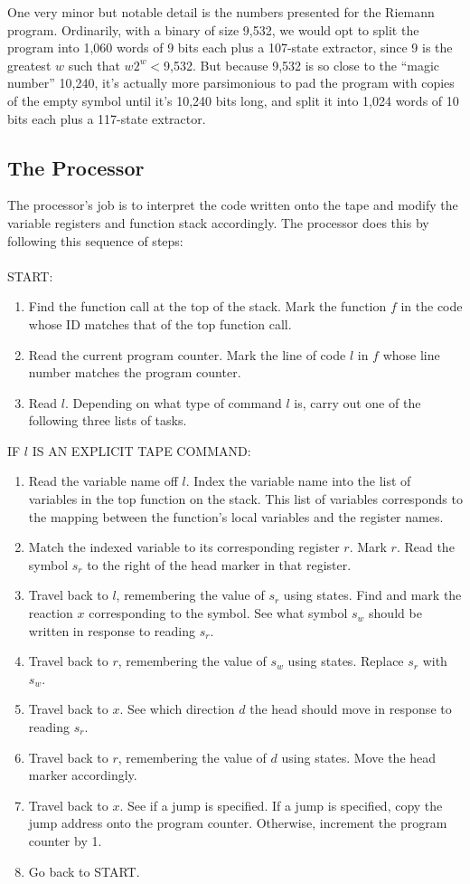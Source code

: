 \documentclass[11pt]{article}
\begin{document}
One very minor but notable detail is the numbers presented for the Riemann program. Ordinarily, with a binary of size 9,532, we would opt to split the program into 1,060 words of 9 bits each plus a 107-state extractor, since 9 is the greatest $w$ such that $w2^w < $9,532. But because 9,532 is so close to the ``magic number'' 10,240, it's actually more parsimonious to pad the program with copies of the empty symbol until it's 10,240 bits long, and split it into 1,024 words of 10 bits each plus a 117-state extractor.

\subsection{The Processor}

The processor's job is to interpret the code written onto the tape and modify the variable registers and function stack accordingly. The processor does this by following this sequence of steps:  \\ \\
START:
\begin{enumerate}
\item Find the function call at the top of the stack. Mark the function $f$ in the code whose ID matches that of the top function call.
\item Read the current program counter. Mark the line of code $l$ in $f$ whose line number matches the program counter.
\item Read $l$. Depending on what type of command $l$ is, carry out one of the following three lists of tasks.
\end{enumerate}

IF $l$ IS AN EXPLICIT TAPE COMMAND:
\begin{enumerate}
\item Read the variable name off $l$. Index the variable name into the list of variables in the top function on the stack. This list of variables corresponds to the mapping between the function's local variables and the register names.
\item Match the indexed variable to its corresponding register $r$. Mark $r$. Read the symbol $s_r$ to the right of the head marker in that register.
\item Travel back to $l$, remembering the value of $s_r$ using states. Find and mark the reaction $x$ corresponding to the symbol. See what symbol $s_w$ should be written in response to reading $s_r$.
\item Travel back to $r$, remembering the value of $s_w$ using states. Replace $s_r$ with $s_w$.
\item Travel back to $x$. See which direction $d$ the head should move in response to reading $s_r$.
\item Travel back to $r$, remembering the value of $d$ using states. Move the head marker accordingly.
\item Travel back to $x$. See if a jump is specified. If a jump is specified, copy the jump address onto the program counter. Otherwise, increment the program counter by 1.
\item Go back to START.
\end{enumerate}
\end{document}
